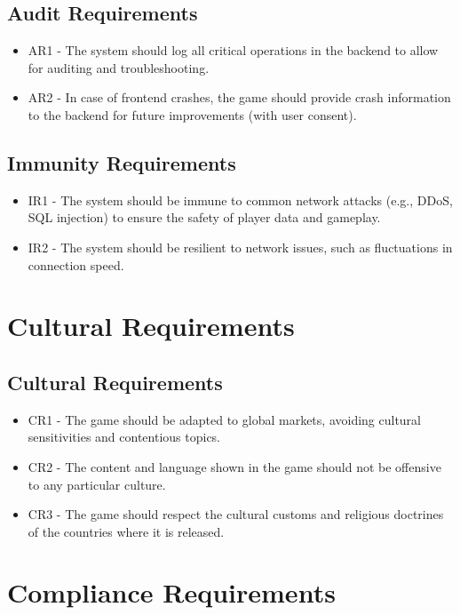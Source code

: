 \documentclass{article}
\begin{document}
\subsection{Audit Requirements}
\begin{itemize}
    \item AR1 - The system should log all critical operations in the backend to allow for auditing and troubleshooting.
    \item AR2 - In case of frontend crashes, the game should provide crash information to the backend for future improvements (with user consent).
\end{itemize}

\subsection{Immunity Requirements}
\begin{itemize}
    \item IR1 - The system should be immune to common network attacks (e.g., DDoS, SQL injection) to ensure the safety of player data and gameplay.
    \item IR2 - The system should be resilient to network issues, such as fluctuations in connection speed.
\end{itemize}

\section{Cultural Requirements}

\subsection{Cultural Requirements}
\begin{itemize}
    \item CR1 - The game should be adapted to global markets, avoiding cultural sensitivities and contentious topics.
    \item CR2 - The content and language shown in the game should not be offensive to any particular culture.
    \item CR3 - The game should respect the cultural customs and religious doctrines of the countries where it is released.
\end{itemize}

\section{Compliance Requirements}
\end{document}
